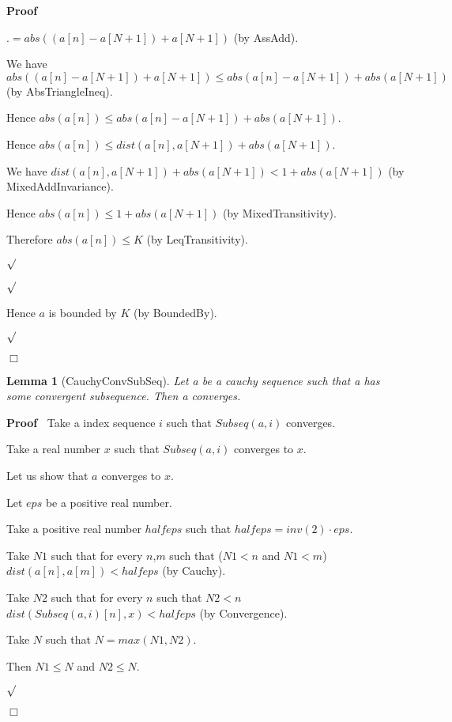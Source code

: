 \documentclass{article}
\newenvironment{forthel}{\begin{leftbar}}{\end{leftbar}}
\newenvironment{proof}{\noindent\textbf{Proof\ }}{\hspace*{\fill}$\Box$\medskip}
\newenvironment{subproof}{\begin{list}{}{}
		\item[\text{Proof}]}{\hfill $\surd$ \end{list}}
\newtheorem{lemma}{Lemma}
\begin{document}
\begin{forthel}
\begin{proof}
\begin{subproof}
\begin{subproof}
\begin{subproof}
					$.= abs((a[n] - a[N + 1]) + a[N + 1])$ (by AssAdd).
					
					We have $abs((a[n] - a[N + 1]) + a[N + 1]) \leq abs(a[n] - a[N + 1]) + abs(a[N + 1])$ (by AbsTriangleIneq).
					
					Hence $abs(a[n]) \leq abs(a[n] - a[N + 1]) + abs(a[N + 1])$.
					
					Hence $abs(a[n]) \leq dist(a[n],a[N + 1]) + abs(a[N + 1])$.
					
					We have $dist(a[n],a[N + 1]) + abs(a[N + 1]) < 1 + abs(a[N + 1])$ (by MixedAddInvariance).
					
					Hence $abs(a[n]) \leq 1 + abs(a[N + 1])$ (by MixedTransitivity).
					
					Therefore $abs(a[n]) \leq K$ (by LeqTransitivity).
					
				\end{subproof}
									
			\end{subproof}
			
			Hence $a$ is bounded by $K$ (by BoundedBy).		
			
		\end{subproof}
	\end{proof}
	
	\begin{lemma}[CauchyConvSubSeq]
		Let a be a cauchy sequence such that a has some convergent subsequence. Then a converges.
	\end{lemma}
	
	\begin{proof}
		Take a index sequence $i$ such that $Subseq(a,i)$ converges.
		
		Take a real number $x$ such that $Subseq(a,i)$ converges to $x$.
		
		Let us show that $a$ converges to $x$.
		
		\begin{subproof}
			Let $eps$ be a positive real number.
			
			Take a positive real number $halfeps$ such that $halfeps = inv(2) \cdot eps$.
			
			Take $N1$ such that for every $n$,$m$ such that ($N1 < n$ and $N1 < m$) $dist(a[n],a[m]) < halfeps$ (by Cauchy).
			
			Take $N2$ such that for every $n$ such that $N2 < n$ $dist(Subseq(a,i)[n],x) < halfeps$ (by Convergence).
			
			Take $N$ such that $N = max(N1,N2)$.
			
			Then $N1 \leq N$ and $N2 \leq N$.
			

\end{subproof}
\end{proof}
\end{forthel}
\end{document}
